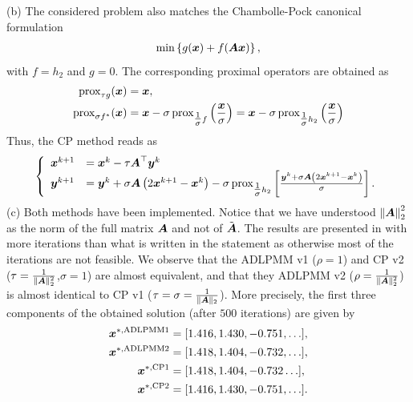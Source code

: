     \indent (b) The considered problem also matches the Chambolle-Pock canonical formulation 
    \begin{align*}
	\min \left\{g(\boldsymbol x) +f(\boldsymbol A\boldsymbol x)  \right\},
\end{align*}
with $f = h_2$ and $g=0$. The corresponding proximal operators are obtained as 
\begin{align*}
	\operatorname{prox}_{\tau g}(\boldsymbol x) &= \boldsymbol x,\\
	\operatorname{prox}_{\sigma f^*}(\boldsymbol x) &= \boldsymbol x - \sigma \operatorname{prox}_{{\textstyle\frac{1}{\sigma}} f}\left(\frac{\boldsymbol x}{\sigma}\right) = \boldsymbol x - \sigma \operatorname{prox}_{{\textstyle\frac{1}{\sigma}} h_2}\left(\frac{\boldsymbol x}{\sigma}\right)
\end{align*}
Thus, the CP method reads as 
\begin{align*}
\begin{split}
  \left\{
  \begin{array}{ll}
        \boldsymbol x^{k+1} &= \boldsymbol x^k - \tau\boldsymbol A^\top \boldsymbol y^k\\
      \boldsymbol y^{k+1} &= \boldsymbol y^k + \sigma \boldsymbol A\left(2\boldsymbol x^{k+1}-\boldsymbol x^k\right)- \sigma \operatorname{prox}_{{\textstyle\frac{1}{\sigma}} h_2}\left[\frac{\boldsymbol y^k + \sigma \boldsymbol A\left(2\boldsymbol x^{k+1}-\boldsymbol x^k\right)}{\sigma} \right].
  \end{array}
  \right.
\end{split}
\end{align*}
\indent (c) Both methods have been implemented. 
Notice that we have understood $\left\|\boldsymbol A\right\|_2^2$ as 
the norm of the full matrix $\boldsymbol A$ and not of 
$\Tilde{\boldsymbol A}$. The results are presented in  
with more iterations than what is written in the statement 
as otherwise most of the iterations are not feasible. 
We observe that the ADLPMM v1 ($\rho =1$) and CP v2 
($\tau = \frac{1}{\|\boldsymbol A\|^2_2}$,$\sigma=1$) are almost 
equivalent, and that they ADLPMM v2 
($\rho = \frac{1}{\|\boldsymbol A\|^2_2}$) is almost identical to 
CP v1 ($\tau = \sigma = \frac{1}{\|\boldsymbol A\|_2}$). 
More precisely, the first three components of the obtained 
solution (after $500$ iterations) are given by
        \begin{align*}
    \boldsymbol x^{*,\text{ADLPMM1}} &= [ 1.416,  1.430, -0.751,\hdots],\\
    \boldsymbol x^{*,\text{ADLPMM2}} &= [1.418,  1.404, -0.732,\hdots],\\
    \boldsymbol x^{*,\text{CP1}} &= [1.418,  1.404 , -0.732\hdots],\\
    \boldsymbol x^{*,\text{CP2}} &= [1.416,  1.430, -0.751 ,\hdots]. \\
    \end{align*}
